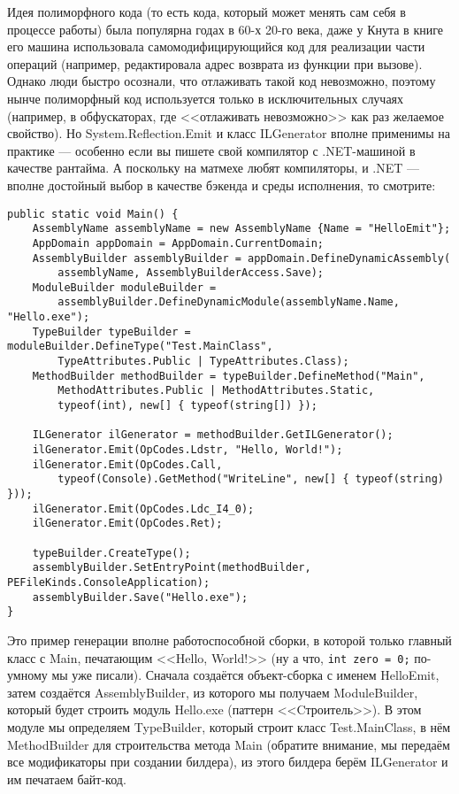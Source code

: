 \documentclass{../../text-style}
\begin{document}
Идея полиморфного кода (то есть кода, который может менять сам себя в процессе работы) была популярна годах в 60-х 20-го века, даже у Кнута в книге его машина использовала самомодифицирующийся код для реализации части операций (например, редактировала адрес возврата из функции при вызове). Однако люди быстро осознали, что отлаживать такой код невозможно, поэтому нынче полиморфный код используется только в исключительных случаях (например, в обфускаторах, где <<отлаживать невозможно>> как раз желаемое свойство). Но System.Reflection.Emit и класс ILGenerator вполне применимы на практике --- особенно если вы пишете свой компилятор с .NET-машиной в качестве рантайма. А поскольку на матмехе любят компиляторы, и .NET --- вполне достойный выбор в качестве бэкенда и среды исполнения, то смотрите:

\begin{verbatim}
public static void Main() {
    AssemblyName assemblyName = new AssemblyName {Name = "HelloEmit"};
    AppDomain appDomain = AppDomain.CurrentDomain;
    AssemblyBuilder assemblyBuilder = appDomain.DefineDynamicAssembly(
        assemblyName, AssemblyBuilderAccess.Save);
    ModuleBuilder moduleBuilder = 
        assemblyBuilder.DefineDynamicModule(assemblyName.Name, "Hello.exe");
    TypeBuilder typeBuilder = moduleBuilder.DefineType("Test.MainClass",
        TypeAttributes.Public | TypeAttributes.Class);
    MethodBuilder methodBuilder = typeBuilder.DefineMethod("Main",
        MethodAttributes.Public | MethodAttributes.Static,
        typeof(int), new[] { typeof(string[]) });

    ILGenerator ilGenerator = methodBuilder.GetILGenerator();
    ilGenerator.Emit(OpCodes.Ldstr, "Hello, World!");
    ilGenerator.Emit(OpCodes.Call,
        typeof(Console).GetMethod("WriteLine", new[] { typeof(string) }));
    ilGenerator.Emit(OpCodes.Ldc_I4_0);
    ilGenerator.Emit(OpCodes.Ret);

    typeBuilder.CreateType();
    assemblyBuilder.SetEntryPoint(methodBuilder, PEFileKinds.ConsoleApplication);
    assemblyBuilder.Save("Hello.exe");
}
\end{verbatim}

Это пример генерации вполне работоспособной сборки, в которой только главный класс с Main, печатающим <<Hello, World!>> (ну а что, \texttt{int zero = 0;} по-умному мы уже писали). Сначала создаётся объект-сборка с именем HelloEmit, затем создаётся AssemblyBuilder, из которого мы получаем ModuleBuilder, который будет строить модуль Hello.exe (паттерн <<Cтроитель>>). В этом модуле мы определяем TypeBuilder, который строит класс Test.MainClass, в нём MethodBuilder для строительства метода Main (обратите внимание, мы передаём все модификаторы при создании билдера), из этого билдера берём ILGenerator и им печатаем байт-код.
\end{document}
